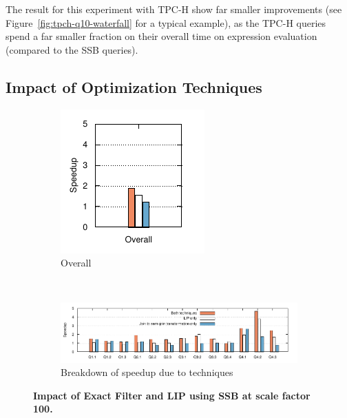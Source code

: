 The result for this experiment with TPC-H show far smaller improvements (see Figure~\ref{fig:tpch-q10-waterfall} for a typical example), as the TPC-H queries spend a far smaller fraction on their overall time on expression evaluation (compared to the SSB queries).

\subsection{Impact of Optimization Techniques}
\label{sec:expt:optimization}

\begin{figure}[t]
	\centering 
	\begin{subfigure}[ht]{0.2\textwidth}
		\includegraphics[width=\textwidth]{system/figures/lip-ef-impact-total}
		\caption{Overall}
	\end{subfigure}
	~
	\begin{subfigure}[ht]{0.7\textwidth}
		\includegraphics[width=\textwidth]{system/figures/lip-ef-impact}
		\caption{Breakdown of speedup due to techniques}
	\end{subfigure}
	\caption{\textbf{Impact of Exact Filter and LIP using SSB at scale factor 100.}}
	\label{fig-lip-ef-impact}
\end{figure}

